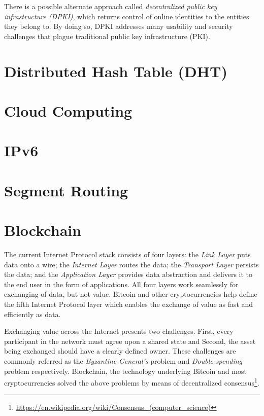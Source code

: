 	There is a possible alternate approach called \textit{decentralized public key infrastructure (DPKI)}, which returns control of online identities to the entities they belong to. By doing so, DPKI addresses many usability and security challenges that plague traditional public key infrastructure (PKI)\cite{allen2015decentralized}.
	
\section{Distributed Hash Table (DHT)}

\section{Cloud Computing}

\section{IPv6}

\section{Segment Routing}

\section{Blockchain}
	The current Internet Protocol stack consists of four layers: the \textit{Link Layer} puts data onto a wire; the \textit{Internet Layer} routes the data; the \textit{Transport Layer} persists the data; and the \textit{Application Layer} provides data abstraction and delivers it to the end user in the form of applications. All four layers work seamlessly for exchanging of data, but not value. Bitcoin\cite{nakamoto2008bitcoin} and other cryptocurrencies help define the fifth Internet Protocol layer which enables the exchange of value as fast and efficiently as data\cite{raval2016decentralized}.
	
	Exchanging value across the Internet presents two challenges. First, every participant in the network must agree upon a shared state and Second, the asset being exchanged should have a clearly defined owner. These challenges are commonly referred as the \textit{Byzantine General's} problem\cite{lamport1982byzantine} and \textit{Double-spending} problem\cite{chohan2017double} respectively. Blockchain, the technology underlying Bitcoin and most cryptocurrencies solved the above problems by means of decentralized consensus\footnote{\url{https://en.wikipedia.org/wiki/Consensus_(computer_science)}}.
	
